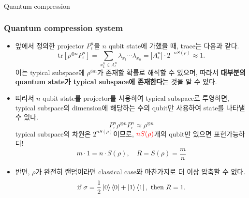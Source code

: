 \documentclass[9pt]{beamer}
\begin{document}
\begin{section}{Quantum compression}
        \begin{frame}
            \frametitle{Quantum compression system}
            \begin{itemize}
                \item 앞에서 정의한 projector $P_\epsilon^n$을 $n$ qubit state에 가했을 때, trace는 다음과 같다.
                \begin{equation*}
                    \text{tr}[\rho^{\otimes n}P_\epsilon^n]  = \sum_{ x_1^n \in A_\epsilon^n} \lambda_{x_1} \cdots \lambda_{x_n} = |A_{\epsilon}^n| \cdot 2^{-nS(\rho)} \approx 1.
                \end{equation*}    
                이는 typical subspace에 $\rho^{\otimes n}$가 존재할 확률로 해석할 수 있으며, 따라서 \textbf{대부분의 quantum state가 typical subspace에 존재한다}는 것을 알 수 있다.
                \item 따라서 $n$ qubit state를 projector를 사용하여 typical subspace로 투영하면, typical subspace의 dimension에 해당하는 수의 qubit만 사용하여 state를 나타낼 수 있다.
                \begin{equation*}
                    P_{\epsilon}^n \rho^{\otimes n} P_\epsilon^n \approx \rho^{\otimes n}
                \end{equation*}
                typical subspace의 차원은 $2^{nS(\rho)}$이므로, $\color{red} n S(\rho)$개의 qubit만 있으면 표현가능하다!
                \begin{equation*}
                    m \cdot 1 = n \cdot S(\rho), \quad \boxed{R = S(\rho) = \frac{m}{n}}
                \end{equation*}
                \item 반면, $\rho$가 완전히 랜덤이라면 classical case와 마찬가지로 더 이상 압축할 수 없다.
                \begin{equation*}
                    \text{if } \sigma = \frac{1}{2} \ket{0}\bra{0} + \ket{1} \bra{1}, \text{ then } R = 1.
                \end{equation*}
            \end{itemize}
        \end{frame}


\end{section}
\end{document}
